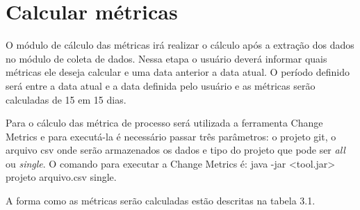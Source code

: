 \section{Calcular métricas}
O módulo de cálculo das métricas irá realizar o cálculo após a extração dos dados no módulo de coleta de dados. Nessa etapa o usuário deverá informar quais métricas ele deseja calcular e uma data anterior a data atual. O período definido será entre a data atual e a data definida pelo usuário e as métricas serão calculadas de 15 em 15 dias.

Para o cálculo das métrica de processo será utilizada a ferramenta Change Metrics e para executá-la é necessário passar três parâmetros: o projeto git, o arquivo csv onde serão armazenados os dados e tipo do projeto que pode ser \textit{all} ou \textit{single}. O comando para executar a Change Metrics é: java -jar <tool.jar> projeto arquivo.csv single. 

A forma como as métricas serão calculadas estão descritas na tabela 3.1. 

